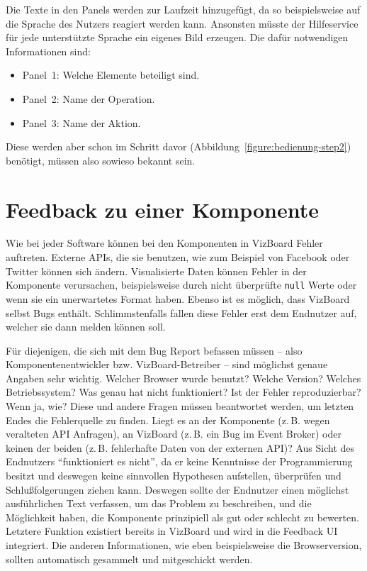 \documentclass[
	headsepline,
	footsepline,
	fontsize=12pt,
	bibliography=totoc
]{scrbook}
\begin{document}
Die Texte in den Panels werden zur Laufzeit hinzugefügt, da so beispielsweise auf die Sprache des Nutzers reagiert werden kann. Ansonsten müsste der Hilfeservice für jede unterstützte Sprache ein eigenes Bild erzeugen. Die dafür notwendigen Informationen sind:

\begin{itemize}
	\item Panel~1: Welche Elemente beteiligt sind.
	\item Panel~2: Name der Operation.
	\item Panel~3: Name der Aktion.
\end{itemize}

Diese werden aber schon im Schritt davor (Abbildung~\ref{figure:bedienung-step2}) benötigt, müssen also sowieso bekannt sein.

\section{Feedback zu einer Komponente}
\label{section:konzeption:feedback}

Wie bei jeder Software können bei den Komponenten in VizBoard Fehler auftreten. Externe APIs, die sie benutzen, wie zum Beispiel von Facebook oder Twitter können sich ändern. Visualisierte Daten können Fehler in der Komponente verursachen, beispielsweise durch nicht überprüfte \texttt{null} Werte oder wenn sie ein unerwartetes Format haben. Ebenso ist es möglich, dass VizBoard selbst Bugs enthält. Schlimmstenfalls fallen diese Fehler erst dem Endnutzer auf, welcher sie dann melden können soll.

Für diejenigen, die sich mit dem Bug Report befassen müssen -- also Komponentenentwickler bzw. VizBoard-Betreiber -- sind möglichst genaue Angaben sehr wichtig. Welcher Browser wurde benutzt? Welche Version? Welches Betriebssystem? Was genau hat nicht funktioniert? Ist der Fehler reproduzierbar? Wenn ja, wie? Diese und andere Fragen müssen beantwortet werden, um letzten Endes die Fehlerquelle zu finden. Liegt es an der Komponente (z.\,B. wegen veralteten API Anfragen), an VizBoard (z.\,B. ein Bug im Event Broker) oder keinen der beiden (z.\,B. fehlerhafte Daten von der externen API)? Aus Sicht des Endnutzers \enquote{funktioniert es nicht}, da er keine Kenntnisse der Programmierung besitzt und deswegen keine sinnvollen Hypothesen aufstellen, überprüfen und Schlußfolgerungen ziehen kann. Deswegen sollte der Endnutzer einen möglichst ausführlichen Text verfassen, um das Problem zu beschreiben, und die Möglichkeit haben, die Komponente prinzipiell als gut oder schlecht zu bewerten. Letztere Funktion existiert bereits in VizBoard und wird in die Feedback UI integriert. Die anderen Informationen, wie eben beispielsweise die Browserversion, sollten automatisch gesammelt und mitgeschickt werden.
\end{document}
